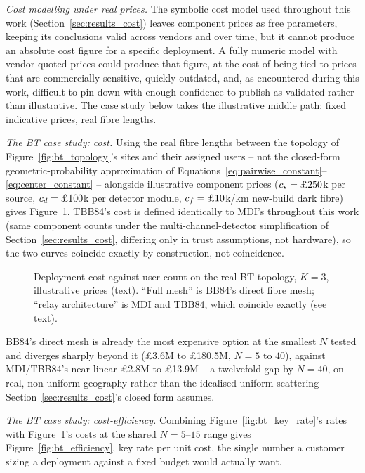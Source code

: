 \documentclass[12pt]{article}
\begin{document}
\textit{Cost modelling under real prices.} The symbolic cost model used throughout this work (Section~\ref{sec:results_cost}) leaves component prices as free parameters, keeping its conclusions valid across vendors and over time, but it cannot produce an absolute cost figure for a specific deployment. A fully numeric model with vendor-quoted prices could produce that figure, at the cost of being tied to prices that are commercially sensitive, quickly outdated, and, as encountered during this work, difficult to pin down with enough confidence to publish as validated rather than illustrative. The case study below takes the illustrative middle path: fixed indicative prices, real fibre lengths.

\textit{The BT case study: cost.} Using the real fibre lengths between the topology of Figure~\ref{fig:bt_topology}'s sites and their assigned users -- not the closed-form geometric-probability approximation of Equations~\ref{eq:pairwise_constant}--\ref{eq:center_constant} -- alongside illustrative component prices ($c_s=\text{\pounds}250$k per source, $c_d=\text{\pounds}100$k per detector module, $c_f=\text{\pounds}10$k/km new-build dark fibre) gives Figure~\ref{fig:bt_cost}. TBB84's cost is defined identically to MDI's throughout this work (same component counts under the multi-channel-detector simplification of Section~\ref{sec:results_cost}, differing only in trust assumptions, not hardware), so the two curves coincide exactly by construction, not coincidence.

\begin{figure}[hbtp]
    \centering
    
    \caption{Deployment cost against user count on the real BT topology, $K=3$, illustrative prices (text). ``Full mesh'' is BB84's direct fibre mesh; ``relay architecture'' is MDI and TBB84, which coincide exactly (see text).}
    \label{fig:bt_cost}
\end{figure}

BB84's direct mesh is already the most expensive option at the smallest $N$ tested and diverges sharply beyond it (\pounds3.6M to \pounds180.5M, $N=5$ to $40$), against MDI/TBB84's near-linear \pounds2.8M to \pounds13.9M -- a twelvefold gap by $N=40$, on real, non-uniform geography rather than the idealised uniform scattering Section~\ref{sec:results_cost}'s closed form assumes.

\textit{The BT case study: cost-efficiency.} Combining Figure~\ref{fig:bt_key_rate}'s rates with Figure~\ref{fig:bt_cost}'s costs at the shared $N=5$--$15$ range gives Figure~\ref{fig:bt_efficiency}, key rate per unit cost, the single number a customer sizing a deployment against a fixed budget would actually want.
\end{document}
